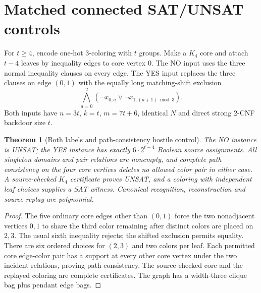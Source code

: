 \documentclass[11pt]{article}
\newtheorem{theorem}{Theorem}
\begin{document}
\section{Matched connected SAT/UNSAT controls}
For $t\ge4$, encode one-hot 3-coloring with $t$ groups. Make a $K_4$ core and attach $t-4$ leaves by inequality edges to core vertex $0$. The NO input uses the three normal inequality clauses on every edge. The YES input replaces the three clauses on edge $(0,1)$ with the equally long matching-shift exclusion
\[
\bigwedge_{a=0}^{2}(\neg x_{0,a}\vee\neg x_{1,(a+1)\bmod3}).
\]
Both inputs have $n=3t$, $k=t$, $m=7t+6$, identical $N$ and direct strong 2-CNF backdoor size $t$.
\begin{theorem}[Both labels and path-consistency hostile control]
The NO instance is UNSAT; the YES instance has exactly $6\cdot2^{t-4}$ Boolean source assignments. All singleton domains and pair relations are nonempty, and complete path consistency on the four core vertices deletes no allowed color pair in either case. A source-checked $K_4$ certificate proves UNSAT, and a coloring with independent leaf choices supplies a SAT witness. Canonical recognition, reconstruction and source replay are polynomial.
\end{theorem}
\begin{proof}
The five ordinary core edges other than $(0,1)$ force the two nonadjacent vertices $0,1$ to share the third color remaining after distinct colors are placed on $2,3$. The usual sixth inequality rejects; the shifted exclusion permits equality. There are six ordered choices for $(2,3)$ and two colors per leaf. Each permitted core edge-color pair has a support at every other core vertex under the two incident relations, proving path consistency. The source-checked core and the replayed coloring are complete certificates. The graph has a width-three clique bag plus pendant edge bags.
\end{proof}
\end{document}
